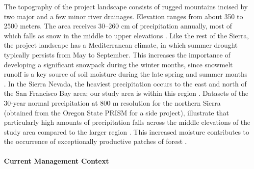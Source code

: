 The topography of the project landscape consists of rugged mountains incised by two major and a few minor river drainages. Elevation ranges from about 350 to 2500 meters. The area receives 30--260 cm of precipitation annually, most of which falls as snow in the middle to upper elevations \citep{Storer1963}. Like the rest of the Sierra, the project landscape has a Mediterranean climate, in which summer drought typically persists from May to September. This increases the importance of developing a significant snowpack during the winter months, since snowmelt runoff is a key source of soil moisture during the late spring and summer months \citep{Minnich2007,Skinner1996}. In the Sierra Nevada, the heaviest precipitation occurs to the east and north of the San Francisco Bay area; our study area is within this region \citep{VanWag2006}. Datasets of the 30-year normal precipitation at 800 m resolution for the northern Sierra (obtained from the Oregon State PRISM for a side project), illustrate that particularly high amounts of precipitation falls across the middle elevations of the study area compared to the larger region \citep{PRISMClimateGroup2004}. This increased moisture contributes to the occurrence of exceptionally productive patches of forest \citep[][ Alan Doerr, personal communication]{Littell2012}.





\paragraph{Current Management Context}

